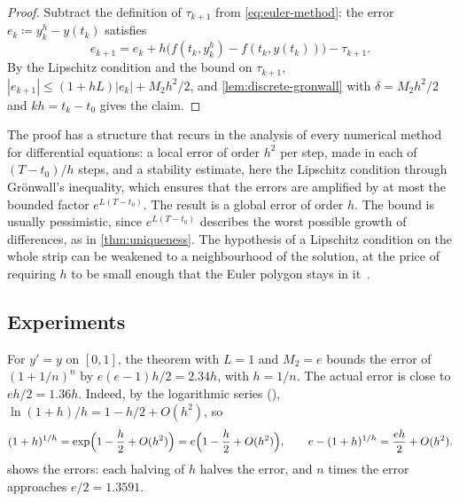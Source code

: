 \begin{proof}
Subtract the definition of $\tau_{k+1}$ from \eqref{eq:euler-method}: the error $e_k\coloneqq y_k^h-y(t_k)$ satisfies
\[
e_{k+1}=e_k+h\bigl(f(t_k,y_k^h)-f(t_k,y(t_k))\bigr)-\tau_{k+1} .
\]
By the Lipschitz condition and the bound on $\tau_{k+1}$, $|e_{k+1}|\le(1+hL)|e_k|+M_2h^2/2$, and \cref{lem:discrete-gronwall} with $\delta=M_2h^2/2$ and $kh=t_k-t_0$ gives the claim.
\end{proof}

The proof has a structure that recurs in the analysis of every numerical method for differential equations: a local error of order $h^2$ per step, made in each of $(T-t_0)/h$ steps, and a stability estimate, here the Lipschitz condition through Gr\"onwall's inequality, which ensures that the errors are amplified by at most the bounded factor $e^{L(T-t_0)}$. The result is a global error of order $h$. The bound is usually pessimistic, since $e^{L(T-t_0)}$ describes the worst possible growth of differences, as in \cref{thm:uniqueness}. The hypothesis of a Lipschitz condition on the whole strip can be weakened to a neighbourhood of the solution, at the price of requiring $h$ to be small enough that the Euler polygon stays in it~\cite[Chap.~II]{hairer1993}.

\subsection{Experiments}

For $y'=y$ on $[0,1]$, the theorem with $L=1$ and $M_2=e$ bounds the error of $(1+1/n)^n$ by $e(e-1)h/2=2.34h$, with $h=1/n$. The actual error is close to $eh/2=1.36h$. Indeed, by the logarithmic series (), $\ln(1+h)/h=1-h/2+O(h^2)$, so
\[
(1+h)^{1/h}=\exp\Bigl(1-\frac h2+O(h^2)\Bigr)=e\Bigl(1-\frac h2+O(h^2)\Bigr),\qquad e-(1+h)^{1/h}=\frac{eh}2+O(h^2).
\]
 shows the errors: each halving of $h$ halves the error, and $n$ times the error approaches $e/2=1.3591$.

